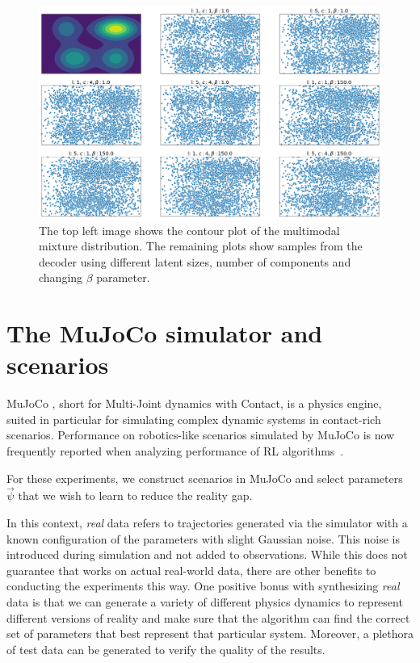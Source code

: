 \begin{figure}
\begin{center}
\includegraphics[width=0.8\linewidth]{img/multimodal_bivariate}
\caption{The top left image shows the contour plot of the multimodal mixture distribution. The remaining plots show samples from the decoder using different latent sizes, number of components and changing $\beta$ parameter.}
\label{fig_multimodal_bivariate}
\end{center}
\end{figure}

\fi

\section{The MuJoCo simulator and scenarios}

MuJoCo \parencite{todorov2012mujoco}, short for Multi-Joint dynamics with Contact, is a physics engine, suited in particular for simulating complex dynamic systems in contact-rich scenarios. Performance on robotics-like scenarios simulated by MuJoCo is now frequently reported when analyzing performance of RL algorithms~\parencite{duan2016benchmarking, popov2017data}.

For these experiments, we construct scenarios in MuJoCo and select parameters $\vec{\psi}$ that we wish to learn to reduce the reality gap. %

In this context, \textit{real} data refers to trajectories generated via the simulator with a known configuration of the parameters with slight Gaussian noise. This noise is introduced during simulation and not added to observations. While this does not guarantee that \dettostoc{} works on actual real-world data, there are other benefits to conducting the experiments this way. One positive bonus with synthesizing \emph{real} data is that we can generate a variety of different physics dynamics to represent different versions of reality and make sure that the algorithm can find the correct set of parameters that best represent that particular system. Moreover, a plethora of test data can be generated to verify the quality of the results.

